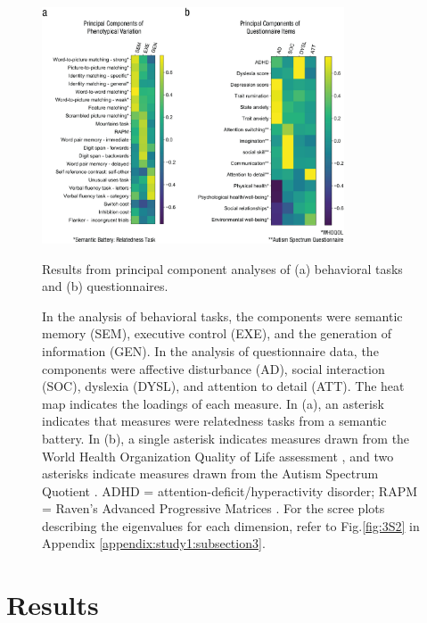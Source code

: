 \begin{figure}[p]
	\centering
	\includegraphics[width=0.8\textwidth]{chapters/img/study1fig3.jpeg}
	\caption{Results from principal component analyses of (a) behavioral tasks and (b) questionnaires.} 
	\caption*{In the analysis of behavioral tasks, the components were semantic memory (SEM), executive control (EXE), and the generation of information (GEN). In the analysis of questionnaire data, the components were affective disturbance (AD), social interaction (SOC), dyslexia (DYSL), and attention to detail (ATT). The heat map indicates the loadings of each measure. In (a), an asterisk indicates that measures were relatedness tasks from a semantic battery. In (b), a single asterisk indicates measures drawn from the World Health Organization Quality of Life assessment \cite{WHOQOL2002}, and two asterisks indicate measures drawn from the Autism Spectrum Quotient \cite{Baron-Cohen2001}. ADHD = attention-deficit/hyperactivity disorder; RAPM = Raven’s Advanced Progressive Matrices \cite{Raven1998}. For the scree plots describing the eigenvalues for each dimension, refer to Fig.\ref{fig:3S2} in Appendix \ref{appendix:study1:subsection3}.}
	\label{fig:study1:fig3}
\end{figure}

\section{Results}
\label{study1:results}


